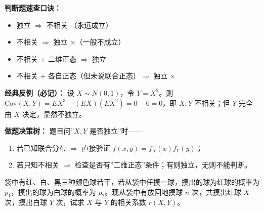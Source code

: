 ﻿\documentclass[lang=cn,11pt]{elegantbook}
\begin{document}
\begin{note}
\textbf{判断题速查口诀：}
\begin{itemize}
    \item 独立 $\Rightarrow$ 不相关 \checkmark（永远成立）
    \item 不相关 $\Rightarrow$ 独立 $\times$（一般不成立）
    \item 不相关 + 二维正态 $\Rightarrow$ 独立 \checkmark
    \item 不相关 + 各自正态（但未说联合正态）$\Rightarrow$ 独立 $\times$
\end{itemize}
\textbf{经典反例（必记）：} 设 $X\sim N(0,1)$，令 $Y=X^2$。则 $\mathrm{Cov}(X,Y)=EX^3-(EX)(EX^2)=0-0=0$，即 $X,Y$ 不相关；但 $Y$ 完全由 $X$ 决定，显然不独立。

\textbf{做题决策树：} 题目问”$X,Y$ 是否独立”时——
\begin{enumerate}
    \item 若已知联合分布 $\Rightarrow$ 直接验证 $f(x,y)=f_X(x)f_Y(y)$；
    \item 若只知不相关 $\Rightarrow$ 检查是否有”二维正态”条件；有则独立，无则不能判断。
\end{enumerate}
\end{note}

\begin{exercise}[多项分布的相关系数] 
袋中有红、白、黑三种颜色球若干，若从袋中任摸一球，摸出的球为红球的概率为 $p_1$，摸出的球为白球的概率为 $p_2$。现从袋中有放回地摸球 $n$ 次，共摸出红球 $X$ 次，摸出白球 $Y$ 次，试求 $X$ 与 $Y$ 的相关系数 $r(X,Y)$。
\end{exercise}
\end{document}
